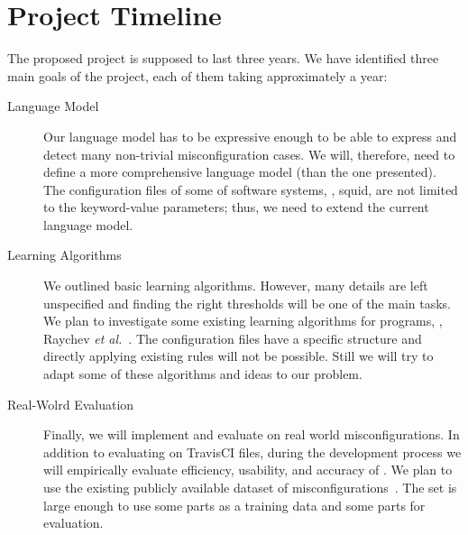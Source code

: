 
\section{Project Timeline}

The proposed project is supposed to last three years. We have identified three main 
goals of the project, each of them taking approximately a year:
\begin{description}
\item[Language Model] 
Our language model has to be expressive enough to be able to express and detect 
many non-trivial misconfiguration cases.
We will, therefore, need to define a more comprehensive language model (than the one presented).  The configuration files of some of software systems, 
\eg, squid, are not limited to the keyword-value parameters; thus,
we need to extend the current language model.
\item [Learning Algorithms]
We outlined basic learning algorithms. However,
many details are left unspecified and finding the right thresholds will be one of the main tasks.
We plan to investigate some existing learning algorithms for programs, \eg,
Raychev {\em et al.}~\cite{raychev15predicting, raychev16learning}. 
The configuration files have a specific structure and directly applying 
existing rules will not be possible. Still we will try to adapt some of these 
algorithms and ideas
to our problem.
\item [Real-Wolrd Evaluation]
Finally, we will implement and evaluate \app on real world misconfigurations.
In addition to evaluating \app on TravisCI files, during the development process 
we will empirically  evaluate efficiency, usability, and
accuracy of \app. We plan to use the existing publicly available dataset of 
misconfigurations~\cite{configdataset}. The set is large enough to use some parts as a  training data and some parts for evaluation.
\end{description}


